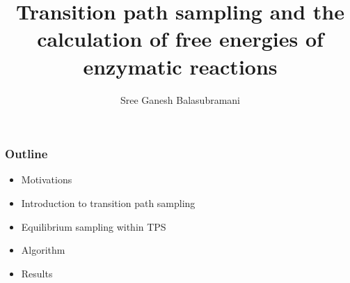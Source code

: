 \documentclass{beamer}
\title[TPS free energies]{Transition path sampling and the calculation of free energies of enzymatic reactions}
\author[Schwartz Group]{Sree Ganesh Balasubramani}
\institute[U of A]{Schwartz Group \\ Chemistry and Biochemistry \\ University of Arizona}
\date{}
\begin{document}
\begin{frame}
  \titlepage
\end{frame}
\begin{frame}
  \frametitle{Outline}
  \begin{itemize}[<+-|alert@+>]
      \item Motivations
      \item Introduction to transition path sampling 
      \item Equilibrium sampling within TPS
      \item Algorithm 
      \item Results
  \end{itemize}
\end{frame}
\end{document}
